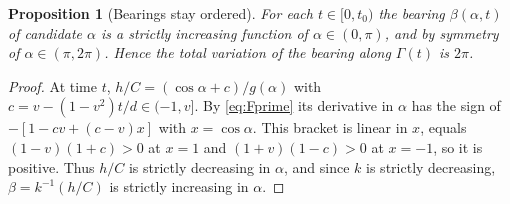 \documentclass[11pt]{article}
\newtheorem{proposition}{Proposition}
\theoremstyle{remark}\newtheorem{remark}{Remark}
\begin{document}
\begin{proposition}[Bearings stay ordered]\label{prop:order}
For each $t\in[0,t_0)$ the bearing $\beta(\alpha,t)$ of candidate $\alpha$ is a strictly increasing function of
$\alpha\in(0,\pi)$, and by symmetry of $\alpha\in(\pi,2\pi)$. Hence the total variation of the bearing along $\Gamma(t)$ is $2\pi$.
\end{proposition}
\begin{proof}
At time $t$, $h/C=(\cos\alpha+c)/g(\alpha)$ with $c=v-(1-v^2)t/d\in(-1,v]$. By \eqref{eq:Fprime} its derivative in $\alpha$
has the sign of $-[1-cv+(c-v)x]$ with $x=\cos\alpha$. This bracket is linear in $x$, equals $(1-v)(1+c)>0$ at $x=1$
and $(1+v)(1-c)>0$ at $x=-1$, so it is positive. Thus $h/C$ is strictly decreasing in $\alpha$, and since $k$ is
strictly decreasing, $\beta=k^{-1}(h/C)$ is strictly increasing in $\alpha$.
\end{proof}
\end{document}
